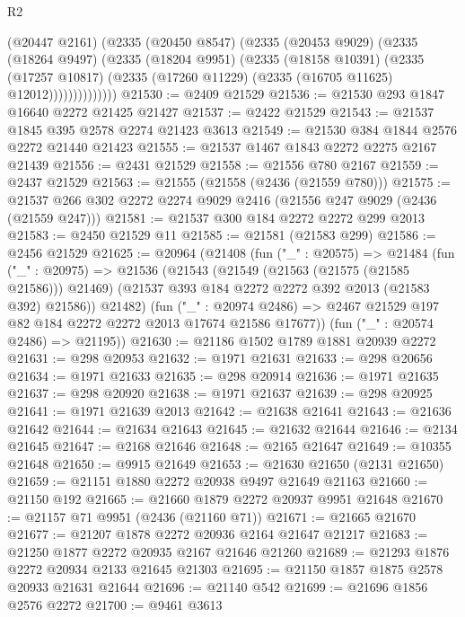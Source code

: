 \begin{lexlean}{R2}
\begin{coremodule}
                (@20447 @2161)
                (@2335
                  (@20450 @8547)
                  (@2335
                    (@20453 @9029)
                    (@2335
                      (@18264 @9497)
                      (@2335
                        (@18204 @9951)
                        (@2335
                          (@18158 @10391)
                          (@2335
                            (@17257 @10817)
                            (@2335 (@17260 @11229) (@2335 (@16705 @11625) @12012))))))))))))))
@21530 := @2409 @21529
@21536 := @21530 @293 @1847 @16640 @2272 @21425 @21427
@21537 := @2422 @21529
@21543 := @21537 @1845 @395 @2578 @2274 @21423 @3613
@21549 := @21530 @384 @1844 @2576 @2272 @21440 @21423
@21555 := @21537 @1467 @1843 @2272 @2275 @2167 @21439
@21556 := @2431 @21529
@21558 := @21556 @780 @2167
@21559 := @2437 @21529
@21563 := @21555 (@21558 (@2436 (@21559 @780)))
@21575 := @21537 @266 @302 @2272 @2274 @9029 @2416 (@21556 @247 @9029 (@2436 (@21559 @247)))
@21581 := @21537 @300 @184 @2272 @2272 @299 @2013
@21583 := @2450 @21529 @11
@21585 := @21581 (@21583 @299)
@21586 := @2456 @21529
@21625 := @20964
    (@21408
      (fun ("_" : @20575) =>
      @21484
        (fun ("_" : @20975) =>
        @21536
          (@21543
            (@21549 (@21563 (@21575 (@21585 @21586))) @21469)
            (@21537 @393 @184 @2272 @2272 @392 @2013 (@21583 @392) @21586))
          @21482)
        (fun ("_" : @20974 @2486) =>
        @2467 @21529 @197 @82 @184 @2272 @2272 @2013 @17674 @21586 @17677))
      (fun ("_" : @20574 @2486) => @21195))
@21630 := @21186 @1502 @1789 @1881 @20939 @2272
@21631 := @298 @20953
@21632 := @1971 @21631
@21633 := @298 @20656
@21634 := @1971 @21633
@21635 := @298 @20914
@21636 := @1971 @21635
@21637 := @298 @20920
@21638 := @1971 @21637
@21639 := @298 @20925
@21641 := @1971 @21639 @2013
@21642 := @21638 @21641
@21643 := @21636 @21642
@21644 := @21634 @21643
@21645 := @21632 @21644
@21646 := @2134 @21645
@21647 := @2168 @21646
@21648 := @2165 @21647
@21649 := @10355 @21648
@21650 := @9915 @21649
@21653 := @21630 @21650 (@2131 @21650)
@21659 := @21151 @1880 @2272 @20938 @9497 @21649 @21163
@21660 := @21150 @192
@21665 := @21660 @1879 @2272 @20937 @9951 @21648
@21670 := @21157 @71 @9951 (@2436 (@21160 @71))
@21671 := @21665 @21670
@21677 := @21207 @1878 @2272 @20936 @2164 @21647 @21217
@21683 := @21250 @1877 @2272 @20935 @2167 @21646 @21260
@21689 := @21293 @1876 @2272 @20934 @2133 @21645 @21303
@21695 := @21150 @1857 @1875 @2578 @20933 @21631 @21644
@21696 := @21140 @542
@21699 := @21696 @1856 @2576 @2272
@21700 := @9461 @3613

\end{coremodule}
\end{lexlean}
